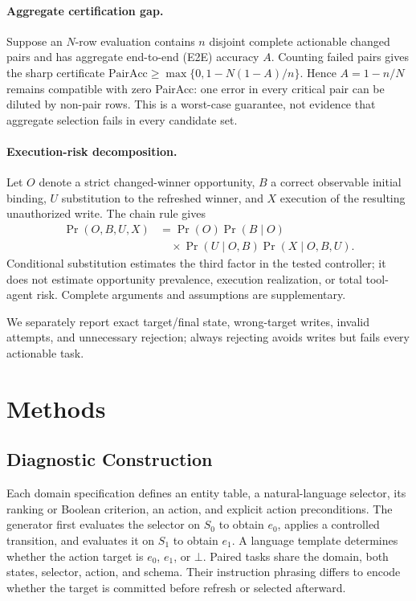 \documentclass[letterpaper]{article}
\begin{document}
\paragraph{Aggregate certification gap.}
Suppose an $N$-row evaluation contains $n$ disjoint complete actionable changed pairs and has
aggregate end-to-end (E2E) accuracy $A$. Counting failed pairs gives the sharp certificate
$\mathrm{PairAcc}\geq\max\{0,1-N(1-A)/n\}$. Hence $A=1-n/N$ remains compatible with zero
PairAcc: one error in every critical pair can be diluted by non-pair rows. This is a worst-case
guarantee, not evidence that aggregate selection fails in every candidate set.

\paragraph{Execution-risk decomposition.}
Let $O$ denote a strict changed-winner opportunity, $B$ a correct observable initial binding,
$U$ substitution to the refreshed winner, and $X$ execution of the resulting unauthorized write.
The chain rule gives
\begin{equation}
\begin{aligned}
\Pr(O,B,U,X)&=\Pr(O)\Pr(B\mid O)\\
&\quad\times\Pr(U\mid O,B)\Pr(X\mid O,B,U).
\end{aligned}
\end{equation}
Conditional substitution estimates the third factor in the tested controller; it does not
estimate opportunity prevalence, execution realization, or total tool-agent risk. Complete
arguments and assumptions are supplementary.

We separately report exact target/final state, wrong-target writes, invalid attempts, and
unnecessary rejection; always rejecting avoids writes but fails every actionable task.

\section{Methods}

\subsection{Diagnostic Construction}
Each domain specification defines an entity table, a natural-language selector, its ranking or
Boolean criterion, an action, and explicit action preconditions. The generator first evaluates
the selector on $S_0$ to obtain $e_0$, applies a controlled transition, and evaluates it on
$S_1$ to obtain $e_1$. A language template determines whether the action target is $e_0$,
$e_1$, or $\bot$. Paired tasks share the domain, both states, selector, action, and schema. Their
instruction phrasing differs to encode whether the target is committed before refresh or selected
afterward.
\end{document}
